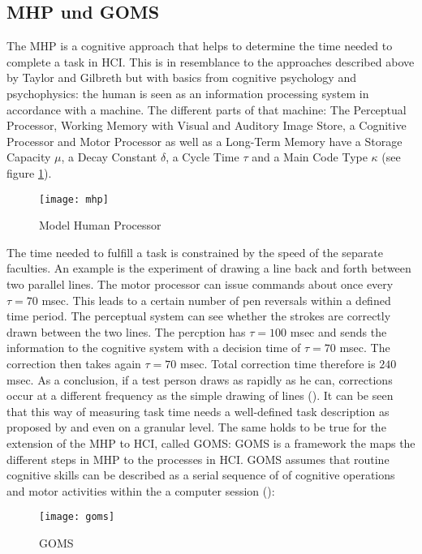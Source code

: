 \subsection{\ac{MHP} und \ac{GOMS}}
The \ac{MHP} is a cognitive approach that helps to determine the time needed to complete a task in \ac{HCI}. This is in resemblance to the approaches described above by Taylor and Gilbreth but with basics from cognitive psychology and psychophysics: the human is seen as an information processing system in accordance with a machine. The different parts of that machine: The Perceptual Processor, Working Memory with Visual and Auditory Image Store, a Cognitive Processor and Motor Processor as well as a Long-Term Memory have a Storage Capacity $\mu$, a Decay Constant $\delta$, a Cycle Time $\tau$ and a Main Code Type $\kappa$ (see figure \ref{fig6}). 

\begin{figure}[ht]
	\centering
  \texttt{[image: mhp]}
	\caption{Model Human Processor}
	\label{fig6}
\end{figure}


The time needed to fulfill a task is constrained by the speed of the separate faculties. An example is the experiment of drawing a line back and forth between two parallel lines. The motor processor can issue commands about once every $\tau=70$ msec. This leads to a certain number of pen reversals within a defined time period. The perceptual system can see whether the strokes are correctly drawn between the two lines. The percption has $\tau=100$ msec and sends the information to the cognitive system with a decision time of $\tau=70$ msec. The correction then takes again $\tau=70$ msec. Total correction time therefore is $240$ msec. As a conclusion, if a test person draws as rapidly as he can, corrections occur at a different frequency as the simple drawing of lines (\cite{card1986model}). It can be seen that this way of measuring task time needs a well-defined task description as proposed by \cite{annett1967task} and even on a granular level. The same holds to be true for the extension of the \ac{MHP} to \ac{HCI}, called \ac{GOMS}: \ac{GOMS} is a framework the maps the different steps in \ac{MHP} to the processes in \ac{HCI}. \ac{GOMS} assumes that routine cognitive skills can be described as a serial sequence of of cognitive operations and motor activities within the a computer session (\cite{olson1990growth}):



\begin{figure}[ht]
	\centering
  \texttt{[image: goms]}
	\caption{GOMS}
	\label{fig3}
\end{figure}

